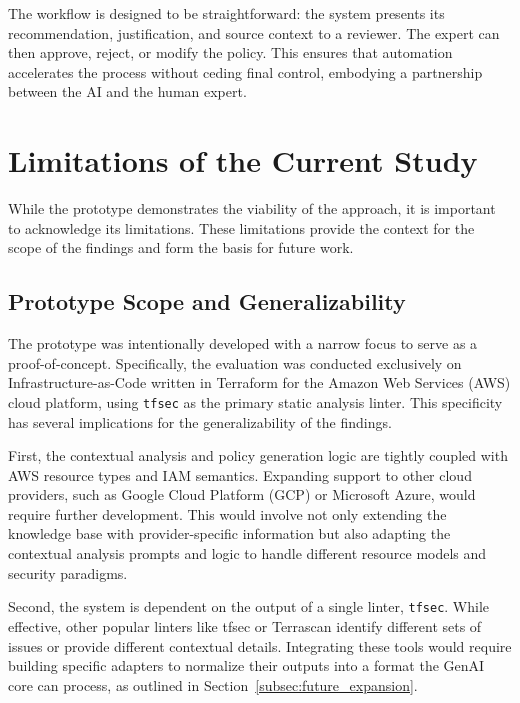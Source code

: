 The workflow is designed to be straightforward: the system presents its recommendation, justification, and source context to a reviewer. The expert can then approve, reject, or modify the policy. This ensures that automation accelerates the process without ceding final control, embodying a partnership between the AI and the human expert.

\section{Limitations of the Current Study}
\label{sec:limitations}


While the prototype demonstrates the viability of the approach, it is important to acknowledge its limitations. These limitations provide the context for the scope of the findings and form the basis for future work.

\subsection{Prototype Scope and Generalizability}
The prototype was intentionally developed with a narrow focus to serve as a proof-of-concept. Specifically, the evaluation was conducted exclusively on Infrastructure-as-Code written in Terraform for the Amazon Web Services (AWS) cloud platform, using \texttt{tfsec} as the primary static analysis linter. This specificity has several implications for the generalizability of the findings.

First, the contextual analysis and policy generation logic are tightly coupled with AWS resource types and IAM semantics. Expanding support to other cloud providers, such as Google Cloud Platform (GCP) or Microsoft Azure, would require further development. This would involve not only extending the knowledge base with provider-specific information but also adapting the contextual analysis prompts and logic to handle different resource models and security paradigms.

Second, the system is dependent on the output of a single linter, \texttt{tfsec}. While effective, other popular linters like tfsec or Terrascan identify different sets of issues or provide different contextual details. Integrating these tools would require building specific adapters to normalize their outputs into a format the GenAI core can process, as outlined in Section~\ref{subsec:future_expansion}.

